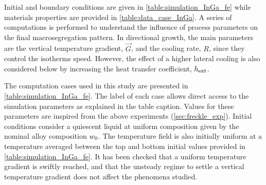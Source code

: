 \begin{table}[htbp]
\centering
\caption{Summary of the simulations and and the corresponding parameters for the FE cases, where a purely macroscopic model is used.
Parameters are varied from (G1) low to (G2) high gradient and (L0) no, to (L1) low lateral cooling.}
\label{table:simulation_InGa_fe}
\end{table}

Initial and boundary conditions are given in \cref{table:simulation_InGa_fe} while materials properties are provided in \cref{table:data_case_InGa}. 
A series of computations is performed to understand the influence of process parameters on the final macrosegregation pattern. 
In directional growth, the main parameters are the vertical temperature gradient, $\vec{G}$, and the cooling rate, $R$, since they control the isotherms 
speed. However, the effect of a higher lateral cooling is also considered below by increasing the heat transfer coefficient,
$h_{\text{ext}}$. 

The computation cases used in this study are presented 
in \cref{table:simulation_InGa_fe}. The label of each case allows direct access to the simulation parameters as explained in the table caption. 
Values for these parameters are inspired from the above experiments (\cref{sec:freckle_exp}). Initial conditions consider a quiescent 
liquid at uniform composition given by the nominal alloy composition ${w}_0$. The temperature field is also initially uniform 
at a temperature averaged between the top and bottom initial values provided in \cref{table:simulation_InGa_fe}. It has been checked that a uniform 
temperature gradient is swiftly reached, and that the unsteady regime to settle a vertical temperature gradient does not affect 
the phenomena studied. 

